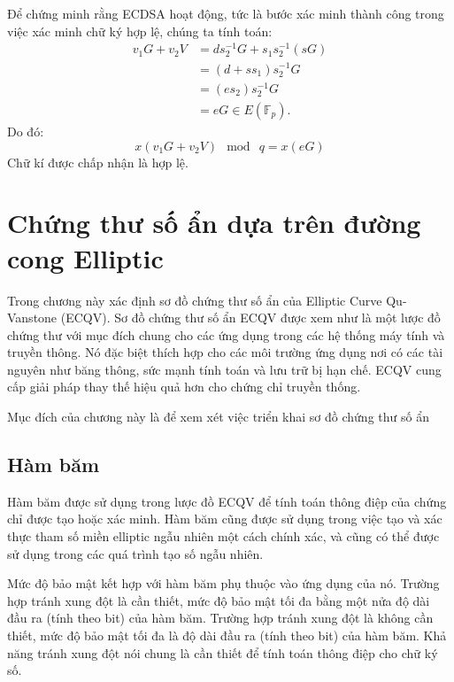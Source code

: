 \documentclass[a4paper,12pt]{report}
\begin{document}
Để chứng minh rằng ECDSA hoạt động, tức là bước xác minh thành công trong việc xác minh chữ ký hợp lệ, chúng ta tính toán:
\begin{displaymath}
\begin{aligned}
v_1G + v_2V & = ds_2^{-1}G + s_1s_2^{-1}(sG) \\
            & = (d + ss_1)s_2^{-1}G \\
            & = (es_2)s_2^{-1}G \\
            & = eG \in E(\mathbb{F}_p).
\end{aligned}
\end{displaymath}
Do đó:
\begin{displaymath}
x(v_1G + v_2V) \mod \ q = x(eG)
\end{displaymath}
Chữ kí được chấp nhận là hợp lệ.
\chapter{Chứng thư số ẩn dựa trên đường cong Elliptic}
Trong chương này xác định sơ đồ chứng thư số ẩn của Elliptic Curve Qu-Vanstone (ECQV). Sơ đồ chứng thư số ẩn ECQV được xem như là một lược đồ chứng thư với mục đích chung cho các ứng dụng trong các hệ thống máy tính và truyền thông. Nó đặc biệt thích hợp cho các môi trường ứng dụng nơi có các tài nguyên như băng thông, sức mạnh tính toán và lưu trữ bị hạn chế. ECQV cung cấp giải pháp thay thế hiệu quả hơn cho chứng chỉ truyền thống.

Mục đích của chương này là để xem xét việc triển khai sơ đồ chứng thư số ẩn %
\section{Hàm băm}
Hàm băm được sử dụng trong lược đồ ECQV để tính toán thông điệp của chứng chỉ được tạo hoặc xác minh. Hàm băm cũng được sử dụng trong việc tạo và xác thực tham số miền elliptic ngẫu nhiên một cách chính xác, và cũng có thể được sử dụng trong các quá trình tạo số ngẫu nhiên.

Mức độ bảo mật kết hợp với hàm băm phụ thuộc vào ứng dụng của nó. Trường hợp tránh xung đột là cần thiết, mức độ bảo mật tối đa bằng một nửa độ dài đầu ra (tính theo bit) của hàm băm. Trường hợp tránh xung đột là không cần thiết, mức độ bảo mật tối đa là độ dài đầu ra (tính theo bit) của hàm băm. Khả năng tránh xung đột nói chung là cần thiết để tính toán thông điệp cho chữ ký số.
\end{document}
